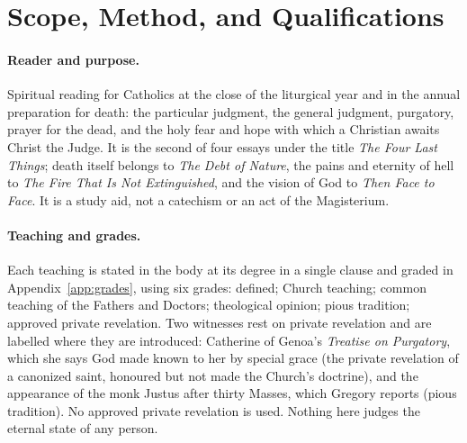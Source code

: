 \section{Scope, Method, and Qualifications}\label{app:scope}

\paragraph{Reader and purpose.} Spiritual reading for Catholics at the close of the liturgical year and in the annual preparation for death: the particular judgment, the general judgment, purgatory, prayer for the dead, and the holy fear and hope with which a Christian awaits Christ the Judge. It is the second of four essays under the title \emph{The Four Last Things}; death itself belongs to \emph{The Debt of Nature}, the pains and eternity of hell to \emph{The Fire That Is Not Extinguished}, and the vision of God to \emph{Then Face to Face}. It is a study aid, not a catechism or an act of the Magisterium.

\paragraph{Teaching and grades.} Each teaching is stated in the body at its degree in a single clause and graded in Appendix~\ref{app:grades}, using six grades: defined; Church teaching; common teaching of the Fathers and Doctors; theological opinion; pious tradition; approved private revelation. Two witnesses rest on private revelation and are labelled where they are introduced: Catherine of Genoa's \emph{Treatise on Purgatory}, which she says God made known to her by special grace (the private revelation of a canonized saint, honoured but not made the Church's doctrine), and the appearance of the monk Justus after thirty Masses, which Gregory reports (pious tradition). No approved private revelation is used. Nothing here judges the eternal state of any person.

